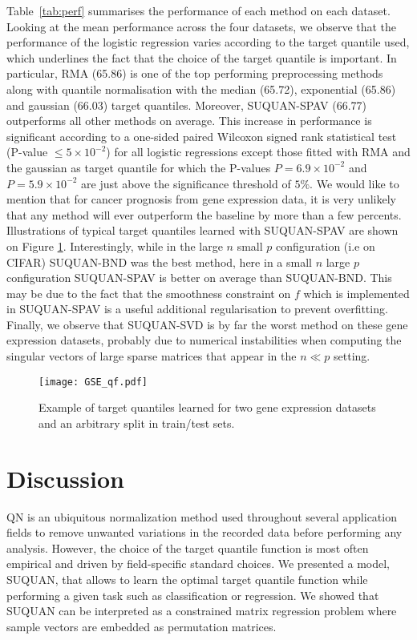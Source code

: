 \documentclass{article}
\begin{document}
Table~\ref{tab:perf} summarises the performance of each method on each dataset. Looking at the mean performance across the four datasets, we observe that the performance of the logistic regression varies according to the target quantile used, which underlines the fact that the choice of the target quantile is important. In particular, RMA (65.86) is one of the top performing preprocessing methods along with quantile normalisation with the median (65.72), exponential (65.86) and gaussian (66.03) target quantiles. Moreover, SUQUAN-SPAV (66.77) outperforms all other methods on average. This increase in performance is significant according to a one-sided paired Wilcoxon signed rank statistical test (P-value $\leq 5 \times 10^{-2}$) for all logistic regressions except those fitted with RMA and the gaussian as target quantile for which the P-values $P=6.9 \times 10^{-2}$ and $P=5.9 \times 10^{-2}$ are just above the significance threshold of $5\%$. We would like to mention that for cancer prognosis from gene expression data, it is very unlikely that any method will ever outperform the baseline by more than a few percents. Illustrations of typical target quantiles learned with SUQUAN-SPAV are shown on Figure \ref{fig:GSE}. Interestingly, while in the large $n$ small $p$ configuration (i.e on CIFAR) SUQUAN-BND was the best method, here in a small $n$ large $p$ configuration SUQUAN-SPAV is better on average than SUQUAN-BND. This may be due to the fact that the smoothness constraint on $f$ which is  implemented in SUQUAN-SPAV is a useful additional regularisation to prevent overfitting. Finally, we observe that SUQUAN-SVD is by far the worst method on these gene expression datasets, probably due to numerical instabilities when computing the singular vectors of large sparse matrices that appear in the $n \ll p$ setting.

\begin{figure}[ht]
\begin{center}
\texttt{[image: GSE\_qf.pdf]}
\caption{Example of target quantiles learned for two gene expression datasets and an arbitrary split in train/test sets.}
\label{fig:GSE}
\end{center}
\end{figure}

\section{Discussion}
QN is an ubiquitous normalization method used throughout several application fields to remove unwanted variations in the recorded data before performing any analysis. However, the choice of the target quantile function is most often empirical and driven by field-specific standard choices. We presented a model, SUQUAN, that allows to learn the optimal target quantile function while performing a given task such as classification or regression. We showed that SUQUAN can be interpreted as a constrained matrix regression problem where sample vectors are embedded as permutation matrices. 
\end{document}
